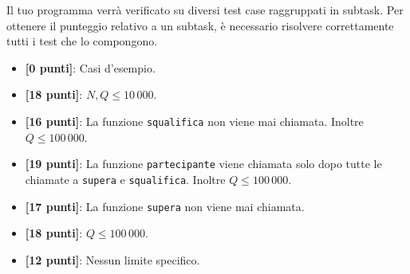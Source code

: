 
\pagebreak


\Scoring

Il tuo programma verrà verificato su diversi test case raggruppati in subtask.
Per ottenere il punteggio relativo a un subtask, è necessario risolvere correttamente tutti i test che lo compongono.

\begin{itemize}[nolistsep,itemsep=2mm]
  \item \textbf{ [\phantom{1}0 punti]}: Casi d'esempio.
  \item \textbf{ [18 punti]}: $N, Q \leq 10\,000$.
  \item \textbf{ [16 punti]}: La funzione \texttt{squalifica} non viene mai chiamata. Inoltre $Q \leq 100\,000$. 
  \item \textbf{ [19 punti]}: La funzione \texttt{partecipante} viene chiamata solo dopo tutte le chiamate a \texttt{supera} e \texttt{squalifica}. Inoltre $Q \leq 100\,000$.
  \item \textbf{ [17 punti]}: La funzione \texttt{supera} non viene mai chiamata.
  \item \textbf{ [18 punti]}: $Q \leq 100\,000$.
  \item \textbf{ [12 punti]}: Nessun limite specifico.
\end{itemize}



\Examples

\begin{example}
%
%
\end{example}


\pagebreak

\Explanation

